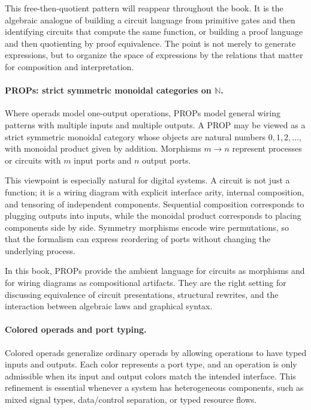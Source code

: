 This free-then-quotient pattern will reappear throughout the book. It is the algebraic analogue of building a circuit language from primitive gates and then identifying circuits that compute the same function, or building a proof language and then quotienting by proof equivalence. The point is not merely to generate expressions, but to organize the space of expressions by the relations that matter for composition and interpretation.

\paragraph{PROPs: strict symmetric monoidal categories on \(\mathbb{N}\).}
Where operads model one-output operations, PROPs model general wiring patterns with multiple inputs and multiple outputs. A PROP may be viewed as a strict symmetric monoidal category whose objects are natural numbers \(0,1,2,\dots\), with monoidal product given by addition. Morphisms \(m \to n\) represent processes or circuits with \(m\) input ports and \(n\) output ports.

This viewpoint is especially natural for digital systems. A circuit is not just a function; it is a wiring diagram with explicit interface arity, internal composition, and tensoring of independent components. Sequential composition corresponds to plugging outputs into inputs, while the monoidal product corresponds to placing components side by side. Symmetry morphisms encode wire permutations, so that the formalism can express reordering of ports without changing the underlying process.

In this book, PROPs provide the ambient language for circuits as morphisms and for wiring diagrams as compositional artifacts. They are the right setting for discussing equivalence of circuit presentations, structural rewrites, and the interaction between algebraic laws and graphical syntax.

\paragraph{Colored operads and port typing.}
Colored operads generalize ordinary operads by allowing operations to have typed inputs and outputs. Each color represents a port type, and an operation is only admissible when its input and output colors match the intended interface. This refinement is essential whenever a system has heterogeneous components, such as mixed signal types, data/control separation, or typed resource flows.

